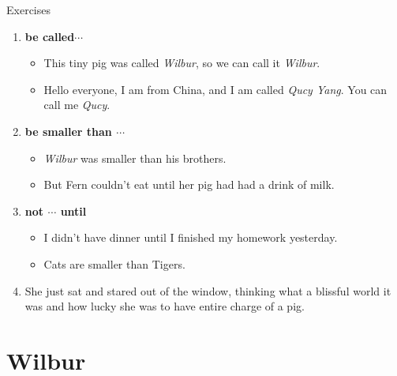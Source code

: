 \documentclass[a4paper, oneside]{book}
\begin{document}
\vspace{2cm}


\bgroup
{}\selectfont

{\Huge Exercises}

{
\large

 \begin{enumerate}
  \item \textbf{be called$\cdots$}
      \begin{itemize}
          \item This tiny pig was called \textit{Wilbur}, so we can call it \textit{Wilbur}.
          
          \item Hello everyone, I am from China, and I am called \textit{Qucy Yang}. You can call me \textit{Qucy}.
      \end{itemize}
   
   \item \textbf{be smaller than $\cdots$}
      \begin{itemize}
          \item \textit{Wilbur} was smaller than his brothers.
          
          \item But Fern couldn't eat until her pig had had a drink of milk.
      \end{itemize}
   
   \item \textbf{not $\cdots$ until}
      \begin{itemize}
          \item I didn't have dinner until I finished my homework yesterday.
          
          \item Cats are smaller than Tigers.
      \end{itemize}
      
   \item She just sat and stared out of the window, thinking what a blissful world it was and how lucky she was to have entire charge of a pig. 
   
   
 \end{enumerate}
 
}
\egroup



 \chapter{Wilbur}
 
\end{document}
